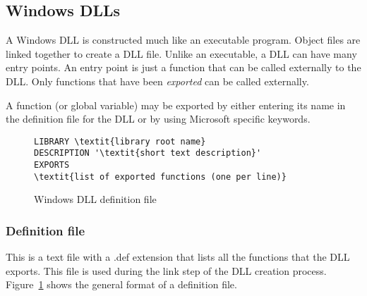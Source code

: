 \subsection{Windows DLLs}

A Windows DLL is constructed much like an executable program. Object files are linked
together to create a DLL file. Unlike an executable, a DLL can have many entry points.
An entry point is just a function that can be called externally to the DLL. Only
functions that have been \emph{exported} can be called externally.

A function (or global variable) may be exported by either entering its
name in the definition file for the DLL or
by using Microsoft specific keywords.

\begin{figure}[t]
\begin{Verbatim}[frame=single,commandchars=\\\{\}]
LIBRARY \textit{library root name}
DESCRIPTION '\textit{short text description}'
EXPORTS
\textit{list of exported functions (one per line)}
\end{Verbatim}
\caption{Windows DLL definition file\label{fig:DefFile}}
\end{figure}

\subsubsection{Definition file}
This is a text file with a {\code .def} extension that lists all the
functions that the DLL exports. This file is used during the link step
of the DLL creation process. Figure~\ref{fig:DefFile} shows the
general format of a definition file.


